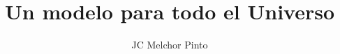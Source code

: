 \documentclass[12pt,addpoints,answers]{guia}
\title{Un modelo para todo el Universo}
\author{JC Melchor Pinto}
\begin{document}
\INFO%
\begin{questions}
    \questionboxed[25]{}
\end{questions}
\end{document}
